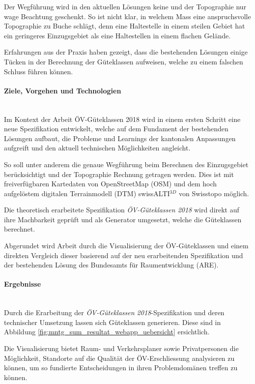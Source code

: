 Der Wegführung wird in den aktuellen Lösungen keine und der Topographie nur wage Beachtung geschenkt.
So ist nicht klar, in welchem Mass eine anspruchsvolle Topographie zu Buche schlägt, denn eine Haltestelle in einem steilen Gebiet hat ein geringeres Einzugsgebiet als eine Haltestellen in einem flachen Gelände.

Erfahrungen aus der Praxis haben gezeigt, dass die bestehenden Lösungen einige Tücken in der Berechnung der Güteklassen aufweisen, welche zu einem falschen Schluss führen können.

\paragraph{Ziele, Vorgehen und Technologien}~\\
Im Kontext der Arbeit ÖV-Güteklassen 2018 wird in einem ersten Schritt eine neue Spezifikation entwickelt, welche auf dem Fundament der bestehenden Lösungen aufbaut, die Probleme und Learnings der kantonalen Anpassungen aufgreift und den aktuell technischen Möglichkeiten angleicht.

So soll unter anderem die genaue Wegführung beim Berechnen des Einzugsgebiet berücksichtigt und der Topographie Rechnung getragen werden.
Dies ist mit freiverfügbaren Kartedaten von OpenStreetMap (OSM) und dem   hoch aufgelöstem digitalen Terrainmodell (DTM) swissALTI$^{3D}$ von Swisstopo möglich.

Die theoretisch erarbeitete Spezifikation \emph{ÖV-Güteklassen 2018} wird direkt auf ihre Machbarkeit geprüft und als Generator umgesetzt, welche die Güteklassen berechnet.

Abgerundet wird Arbeit durch die Visualisierung der ÖV-Güteklassen und einem direkten Vergleich dieser basierend auf der neu erarbeitenden Spezifikation  und der bestehenden Lösung des Bundesamts für Raumentwicklung (ARE).

\paragraph{Ergebnisse}~\\
Durch die Erarbeitung der \emph{ÖV-Güteklassen 2018}-Spezifikation und deren technischer Umsetzung lassen sich Güteklassen generieren.
Diese sind in Abbildung \ref{fig:mntg_sum_resultat_webapp_uebersicht} ersichtlich.

Die Visualisierung bietet Raum- und Verkehrsplaner sowie Privatpersonen die Möglichkeit, Standorte auf die Qualität der ÖV-Erschliessung analysieren zu können, um so fundierte Entscheidungen in ihren Problemdomänen treffen zu können.

